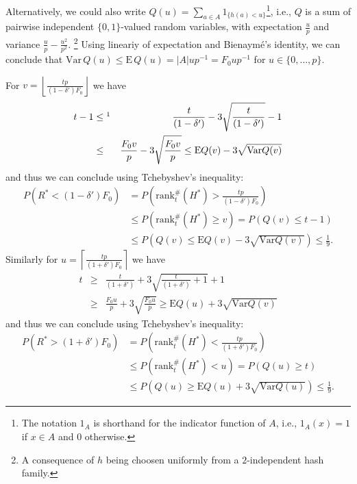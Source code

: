 \documentclass[11pt,a4paper]{article}
\newcommand{\var}{\mathrm{Var}}
\newcommand{\expectation}{\mathrm{E}}
\begin{document}
Alternatively, we could also write $Q(u) = \sum_{a \in A} 1_{\{h(a) < u\}}$\footnote{The notation $1_A$ is shorthand for the indicator function of $A$, i.e., $1_A(x)=1$ if $x \in A$ and $0$ otherwise.}, i.e., $Q$ is a sum of pairwise independent $\{0,1\}$-valued random variables, with expectation $\frac{u}{p}$ and variance $\frac{u}{p} - \frac{u^2}{p^2}$.
\footnote{A consequence of $h$ being choosen uniformly from a $2$-independent hash family.}
Using lineariy of expectation and Bienaym\'e's identity, we can conclude that $\var \, Q(u) \leq \expectation \, Q(u) = |A|u p^{-1} = F_0 u p^{-1}$ for $u \in \{0,\ldots,p\}$.

For $v = \left\lfloor \frac{tp}{(1-\delta') F_0} \right\rfloor$ we have
\begin{eqnarray*}
    t-1 & \leq\footnotemark & \frac{t}{(1-\delta')} - 3\sqrt{\frac{t}{(1-\delta')}} - 1 \\
     &\leq&  \frac{F_0 v}{p} - 3 \sqrt{\frac{F_0 v}{p}} \leq \expectation Q(v) - 3 \sqrt{\var Q(v)}
\end{eqnarray*}
and thus we can conclude using Tchebyshev's inequality:
\begin{align}
    P\left(R^* < \left(1-\delta'\right) F_0\right) & = P\left(\mathrm{rank}_t^{\#}(H^*) > \frac{tp}{(1-\delta')F_0}\right) \nonumber \\ 
    & \leq P(\mathrm{rank}_t^{\#}(H^*) \geq v) = P(Q(v) \leq t-1) \label{eq:r_star_upper_bound} \\
    & \leq P\left(Q(v) \leq \expectation Q(v) - 3 \sqrt{\var Q(v)}\right) \leq \frac{1}{9} \textrm{.} \nonumber
\end{align}
Similarly for $u = \left\lceil \frac{tp}{(1+\delta') F_0} \right\rceil$ we have
\begin{eqnarray*}
    t & \geq & \frac{t}{(1+\delta')} + 3\sqrt{\frac{t}{(1+\delta')}+1} + 1 \\
     &\geq&  \frac{F_0 u}{p} + 3 \sqrt{\frac{F_0 u}{p}} \geq \expectation Q(u) + 3 \sqrt{\var Q(v)}
\end{eqnarray*}
and thus we can conclude using Tchebyshev's inequality:
\begin{align}
    P\left(R^* > \left(1+\delta'\right) F_0\right) & = P\left(\mathrm{rank}_t^{\#}(H^*) < \frac{tp}{(1+\delta')F_0}\right) \nonumber \\ 
    & \leq P(\mathrm{rank}_t^{\#}(H^*) < u) = P(Q(u) \geq t) \label{eq:r_star_lower_bound} \\
    & \leq P\left(Q(u) \geq \expectation Q(u) + 3 \sqrt{\var Q(u)}\right) \leq \frac{1}{9} \textrm{.} \nonumber
\end{align}
\end{document}
